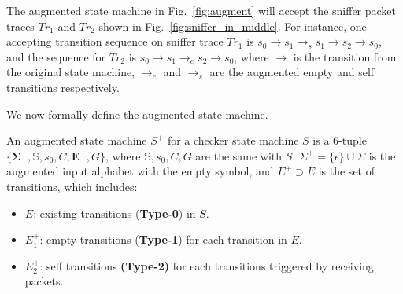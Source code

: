 The augmented state machine in Fig.~\ref{fig:augment} will accept the sniffer
packet traces $Tr_1$ and $Tr_2$ shown in Fig.~\ref{fig:sniffer_in_middle}.  For
instance, one accepting transition sequence on sniffer trace $Tr_1$ is
$s_0\rightarrow s_1 \rightarrow_s s_1\rightarrow s_2 \rightarrow s_0$, and the
sequence for $Tr_2$ is $s_0 \rightarrow s_1 \rightarrow_e s_2 \rightarrow s_0$,
where $\rightarrow$ is the transition from the original state machine,
$\rightarrow_e$ and $\rightarrow_s$ are the augmented empty and self transitions
respectively.

We now formally define the augmented state machine.

\begin{definition}
  An augmented state machine $S^+$ for a checker state machine $S$ is a 6-tuple
  $\{\boldsymbol{\Sigma^+}, \mathbb{S}, s_0, C, \boldsymbol{E^+}, G\}$, where $\mathbb{S},
  s_0, C, G$ are the same with $S$. $\Sigma^+=\{\epsilon\} \cup \Sigma$ is
  the augmented input alphabet with the empty symbol, and $E^+ \supset E$ is the
  set of transitions, which includes:
  \begin{itemize}
    \item $E$: existing transitions (\textbf{Type-0}) in $S$.
    \item $E^+_1$: empty transitions (\textbf{Type-1}) for each transition in $E$.
    \item $E^+_2$: self transitions \textbf{(Type-2)} for each transitions
      triggered by receiving packets.
  \end{itemize}
\end{definition}

